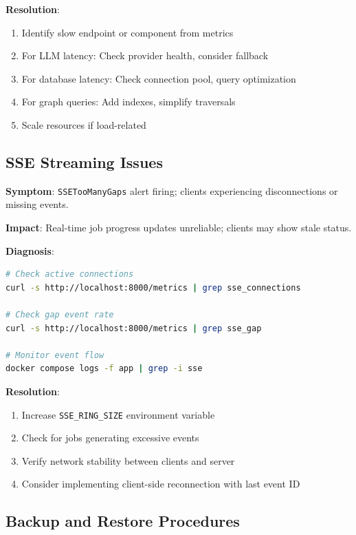\textbf{Resolution}:
\begin{enumerate}
    \item Identify slow endpoint or component from metrics
    \item For LLM latency: Check provider health, consider fallback
    \item For database latency: Check connection pool, query optimization
    \item For graph queries: Add indexes, simplify traversals
    \item Scale resources if load-related
\end{enumerate}

\subsection{SSE Streaming Issues}

\textbf{Symptom}: \texttt{SSETooManyGaps} alert firing; clients experiencing disconnections or missing events.

\textbf{Impact}: Real-time job progress updates unreliable; clients may show stale status.

\textbf{Diagnosis}:
\begin{lstlisting}[language=bash, caption={SSE diagnostic commands}]
# Check active connections
curl -s http://localhost:8000/metrics | grep sse_connections

# Check gap event rate
curl -s http://localhost:8000/metrics | grep sse_gap

# Monitor event flow
docker compose logs -f app | grep -i sse
\end{lstlisting}

\textbf{Resolution}:
\begin{enumerate}
    \item Increase \texttt{SSE\_RING\_SIZE} environment variable
    \item Check for jobs generating excessive events
    \item Verify network stability between clients and server
    \item Consider implementing client-side reconnection with last event ID
\end{enumerate}

\subsection{Backup and Restore Procedures}
\label{subsec:backup-restore}

